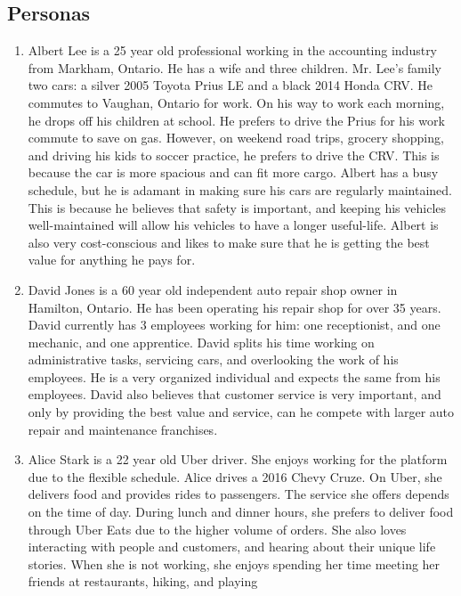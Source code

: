 \documentclass[12pt]{article}
\begin{document}
\subsection{Personas}
\begin{enumerate}
	\item Albert Lee is a 25 year old professional working in the accounting industry from Markham, Ontario.
	      He has a wife and three children. Mr. Lee's family two cars: a silver 2005 Toyota Prius LE and a
	      black 2014 Honda CRV. He commutes to Vaughan, Ontario for work. On his way to work each morning, he
	      drops off his children at school. He prefers to drive the Prius for his work commute to save on
	      gas. However, on weekend road trips, grocery shopping, and driving his kids to soccer practice, he
	      prefers to drive the CRV. This is because the car is more spacious and can fit more cargo. Albert
	      has a busy schedule, but he is adamant in making sure his cars are regularly maintained. This is
	      because he believes that safety is important, and keeping his vehicles well-maintained will allow
	      his vehicles to have a longer useful-life. Albert is also very cost-conscious and likes to make
	      sure that he is getting the best value for anything he pays for.
	\item David Jones is a 60 year old independent auto repair shop owner in Hamilton, Ontario. He has been
	      operating his repair shop for over 35 years. David currently has 3 employees working for him: one
	      receptionist, and one mechanic, and one apprentice. David splits his time working on administrative
	      tasks, servicing cars, and overlooking the work of his employees. He is a very organized individual
	      and expects the same from his employees. David also believes that customer service is very
	      important, and only by providing the best value and service, can he compete with larger auto repair
	      and maintenance franchises.
	\item Alice Stark is a 22 year old Uber driver. She enjoys working for the platform due to the flexible
	      schedule. Alice drives a 2016 Chevy Cruze. On Uber, she delivers food and provides rides to
	      passengers. The service she offers depends on the time of day. During lunch and dinner hours, she
	      prefers to deliver food through Uber Eats due to the higher volume of orders. She also loves
	      interacting with people and customers, and hearing about their unique life stories. When she is not
	      working, she enjoys spending her time meeting her friends at restaurants, hiking, and playing

\end{enumerate}
\end{document}
